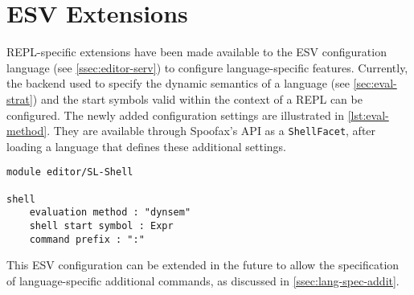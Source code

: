 \section{ESV Extensions}
\label{sec:esv-extensions}

REPL-specific extensions have been made available to the ESV configuration
language (see \cref{ssec:editor-serv}) to configure language-specific
features. Currently, the backend used to specify the dynamic semantics of a
language (see \cref{sec:eval-strat}) and the start symbols valid within the
context of a REPL can be configured. The newly added configuration settings are
illustrated in \cref{lst:eval-method}. They are available through Spoofax's API
as a \texttt{ShellFacet}, after loading a language that defines these additional
settings.

\begin{lstlisting}[language=esv,caption={Configuring language specific settings.},label={lst:eval-method}]
module editor/SL-Shell

shell
    evaluation method : "dynsem"
    shell start symbol : Expr
    command prefix : ":"
\end{lstlisting}

This ESV configuration can be extended in the future to allow the specification
of language-specific additional commands, as discussed in
\cref{ssec:lang-spec-addit}.

